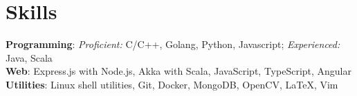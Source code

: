 \section*{Skills}
\textbf{Programming}: {\textit{Proficient: } C/C++, Golang, Python, Javascript; \quad
  \textit{Experienced: } Java, Scala}\\
\textbf{Web}: {Express.js with Node.js, Akka with Scala, JavaScript, TypeScript, Angular}\\
\textbf{Utilities}: {Linux shell utilities, Git, Docker, MongoDB, OpenCV, \LaTeX, Vim}
